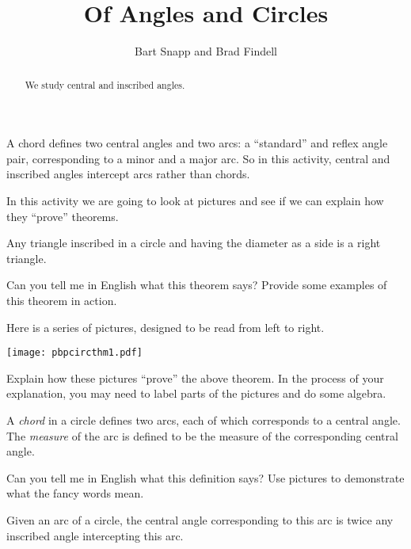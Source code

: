 \documentclass[nooutcomes]{ximera}
\title{Of Angles and Circles}
\author{Bart Snapp and Brad Findell}
\begin{document}
\begin{abstract}
We study central and inscribed angles.
\end{abstract}
\maketitle

\begin{teachingnote}
A chord defines two central angles and two arcs: a ``standard'' and reflex angle pair, corresponding to a minor and a major arc.  So in this activity, central and inscribed angles intercept arcs rather than chords.
\end{teachingnote}

In this activity we are going to look at pictures and see if we can
explain how they ``prove'' theorems.

\begin{theorem} 
Any triangle inscribed in a circle and having the diameter as a side is a
right triangle.
\end{theorem}

\begin{problem}
Can you tell me in English what this theorem says? Provide some
examples of this theorem in action.
\vfill
\end{problem}

\begin{problem} 
Here is a series of pictures, designed to be read from left to right.
\begin{image}
\texttt{[image: pbpcircthm1.pdf]}
\end{image}
Explain how these pictures ``prove'' the above theorem. In the process
of your explanation, you may need to label parts of the pictures and
do some algebra.
\vfill
\end{problem}

\newpage
\begin{definition}
A \emph{chord} in a circle defines two {arcs}, each of which corresponds to a {central angle}.  The \emph{measure} of the arc is defined to be the measure of the corresponding central angle.  
\end{definition}

\begin{problem}
Can you tell me in English what this definition says? Use pictures to demonstrate what the fancy words mean.  
\vfill
\end{problem}

\begin{theorem} 
Given an arc of a circle, the central angle corresponding to this arc is
twice any inscribed angle intercepting this arc.
\end{theorem}
\end{document}
